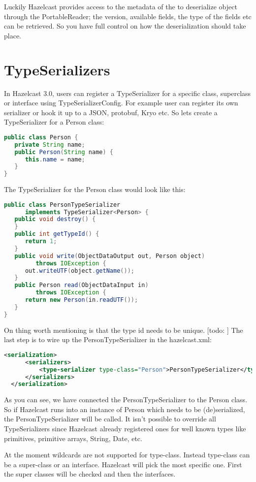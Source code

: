 Luckily Hazelcast provides access to the metadata of the to deserialize object through the PortableReader; the  version, available fields, the type of the fields etc can be retrieved. So you have full control on how the deserialization should take place. 

\section{TypeSerializers}
In Hazelcast 3.0, users can register a TypeSerializer for a specific class, superclass or interface using TypeSerializerConfig. For example user can register its own serializer or hook it up to a JSON, protobuf, Kryo etc. So lets create a TypeSerializer for a Person class:
\begin{lstlisting}[language=java]
public class Person {
   private String name;
   public Person(String name) {
      this.name = name;
   }
}
\end{lstlisting}
The TypeSerializer for the Person class would look like this:
\begin{lstlisting}[language=java]
public class PersonTypeSerializer 
      implements TypeSerializer<Person> {
   public void destroy() {	  
   }
   public int getTypeId() {
      return 1;
   }
   public void write(ObjectDataOutput out, Person object) 
         throws IOException {
      out.writeUTF(object.getName());
   }
   public Person read(ObjectDataInput in) 
         throws IOException {
      return new Person(in.readUTF());
   }
}
\end{lstlisting}
On thing worth mentioning is that the type id needs to be unique. [todo: ] The last step is to wire up the PersonTypeSerializer in the hazelcast.xml:
\begin{lstlisting}[language=xml]
<serialization>
      <serializers>
          <type-serializer type-class="Person">PersonTypeSerializer</type-serializer>
      </serializers>
  </serialization>
\end{lstlisting}
As you can see, we have connected the PersonTypeSerializer to the Person class. So if Hazelcast runs into an instance of Person which needs to be (de)serialized, the PersonTypeSerializer will be called. It isn't possible to override all TypeSerializers since Hazelcast already registered ones for well known types like primitives, primitive arrays, String, Date, etc.

At the moment wildcards are not supported for type-class. Instead type-class can be a super-class or an interface. Hazelcast will pick the most specific one. First the super classes will be checked and then the interfaces.

